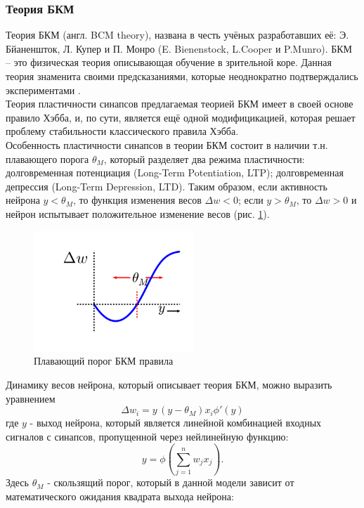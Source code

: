 \documentclass[a4paper,10pt]{article}
\begin{document}
\subsubsection{Теория БКМ}
\indent Теория БКМ (англ. BCM theory), названа в честь учёных разработавших её: Э. Бйаненшток, Л. Купер и П. Монро (E. Bienenstock, L.Cooper и P.Munro). БКМ -- это физическая теория описывающая обучение в зрительной коре. Данная теория знаменита своими предсказаниями, которые неоднократно подтверждались экспериментами \cite{Cooper}.\\
\indent Теория пластичности синапсов предлагаемая теорией БКМ имеет в своей основе правило Хэбба, и, по сути, является ещё одной модифицикацией, которая решает проблему стабильности классического правила Хэбба.\\
\indent Особенность пластичности синапсов в теории БКМ состоит в наличии т.н. плавающего порога $\theta_{M}$, который разделяет два режима пластичности: долговременная потенциация (Long-Term Potentiation, LTP); долговременная депрессия (Long-Term Depression, LTD). Таким образом, если активность нейрона $y<\theta_{M}$, то функция изменения весов $\Delta w<0$; если $y>\theta_{M}$, то $\Delta w>0$ и нейрон испытывает положительное изменение весов (рис. \ref{bcm_pic}).
\begin{figure}[ht]
\centering
\captionsetup{justification=centering,margin=1cm}
\includegraphics[width=60mm,scale=0.2]{bcm.png}
\caption{Плавающий порог БКМ правила}
\label{bcm_pic}
\end{figure}
\FloatBarrier
\indent Динамику весов нейрона, который описывает теория БКМ, можно выразить уравнением
\begin{equation}
\Delta w_{i} = y\,(y - \theta_{M})x_{i}\phi'(y)
\end{equation}
где $y$ - выход нейрона, который является линейной комбинацией входных сигналов с синапсов, пропущенной через нейлинейную функцию:
\begin{equation}
y = \phi(\sum_{j=1}^{n}w_{j}x_{j}).
\end{equation}
Здесь $\theta_{M}$ - скользящий порог, который в данной модели зависит от математического ожидания квадрата выхода нейрона:
\end{document}
